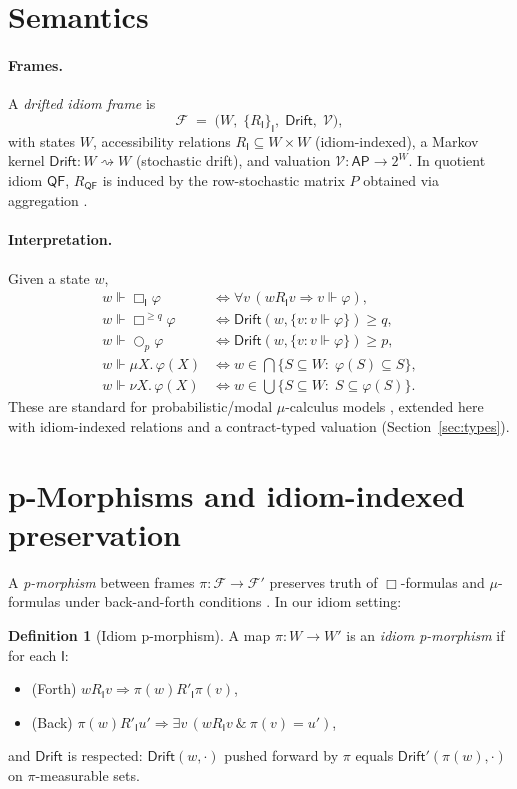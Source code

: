 \documentclass[11pt]{article}
\theoremstyle{plain}
\theoremstyle{definition}
\newtheorem{definition}[theorem]{Definition}
\theoremstyle{remark}
\newcommand{\1}{\mathbbm{1}}
\begin{document}
\section{Semantics}\label{sec:semantics}
\paragraph{Frames.} A \emph{drifted idiom frame} is
\[
\mathcal{F} \;=\; \big( W,\; \{R_{\mathsf{I}}\}_{\mathsf{I}},\; \mathsf{Drift},\; \mathcal{V}\big),
\]
with states $W$, accessibility relations $R_{\mathsf{I}}\subseteq W\times W$ (idiom-indexed), a Markov kernel $\mathsf{Drift}:W\rightsquigarrow W$ (stochastic drift), and valuation $\mathcal{V}:\mathsf{AP}\to 2^W$. In quotient idiom $\mathsf{QF}$, $R_{\mathsf{QF}}$ is induced by the row-stochastic matrix $P$ obtained via aggregation \parencite{elliott2025qfi}.

\paragraph{Interpretation.} Given a state $w$,
\begin{align*}
w \Vdash \Box_{\mathsf{I}}\varphi &\iff \forall v\,(w R_{\mathsf{I}} v \Rightarrow v\Vdash\varphi),\\
w \Vdash \Box^{\ge q}\varphi &\iff \mathsf{Drift}(w,\{v:v\Vdash\varphi\}) \ge q,\\
w \Vdash \bigcirc_{p}\varphi &\iff \mathsf{Drift}(w,\{v:v\Vdash\varphi\}) \ge p,\\
w \Vdash \mu X.\,\varphi(X) &\iff w\in \bigcap\{S\subseteq W:\; \varphi(S)\subseteq S\},\\
w \Vdash \nu X.\,\varphi(X) &\iff w\in \bigcup\{S\subseteq W:\; S\subseteq \varphi(S)\}.
\end{align*}
These are standard for probabilistic/modal $\mu$-calculus models \parencite{Kozen1983,Stirling2001}, extended here with idiom-indexed relations and a contract-typed valuation (Section~\ref{sec:types}).

\section{p-Morphisms and idiom-indexed preservation}\label{sec:pmor}
A \emph{p-morphism} between frames $\pi:\mathcal{F}\to\mathcal{F}'$ preserves truth of $\Box$-formulas and $\mu$-formulas under back-and-forth conditions \parencite[Ch.\ 2]{BlackburnRijkeVenema2001}. In our idiom setting:

\begin{definition}[Idiom p-morphism]
A map $\pi:W\to W'$ is an \emph{idiom p-morphism} if for each $\mathsf{I}$:
\begin{itemize}
\item (Forth) $w R_{\mathsf{I}} v \Rightarrow \pi(w) R'_{\mathsf{I}} \pi(v)$,
\item (Back) $\pi(w) R'_{\mathsf{I}} u' \Rightarrow \exists v\,(w R_{\mathsf{I}} v\ \&\ \pi(v)=u')$,
\end{itemize}
and $\mathsf{Drift}$ is respected: $\mathsf{Drift}(w,\cdot)$ pushed forward by $\pi$ equals $\mathsf{Drift}'(\pi(w),\cdot)$ on $\pi$-measurable sets.
\end{definition}
\end{document}

